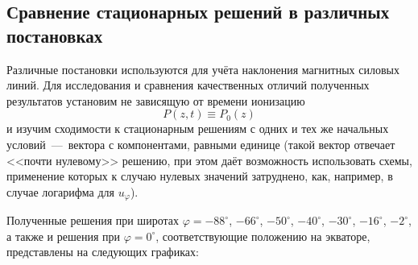 \documentclass[14pt, a4paper, fleqn]{extarticle}
\begin{document}




\subsection{Сравнение стационарных решений в различных постановках}


Различные постановки используются для учёта наклонения магнитных силовых линий. Для исследования и сравнения качественных отличий полученных результатов установим не зависящую от времени ионизацию $$P(z, t) \equiv P_0(z)$$ и изучим сходимости к стационарным решениям с одних и тех же начальных условий~---~вектора с компонентами, равными единице (такой вектор отвечает <<почти нулевому>> решению, при этом даёт возможность использовать схемы, применение которых к случаю нулевых значений затруднено, как, например, в случае логарифма для $u_\varphi$). 

Полученные решения при широтах $\varphi = -88^\circ$, $-66^\circ$, $-50^\circ$, $-40^\circ$, $-30^\circ$, $-16^\circ$, $-2^\circ$, а также и решения при $\varphi = 0^\circ$, соответствующие положению на экваторе, представлены на следующих графиках:
\end{document}
